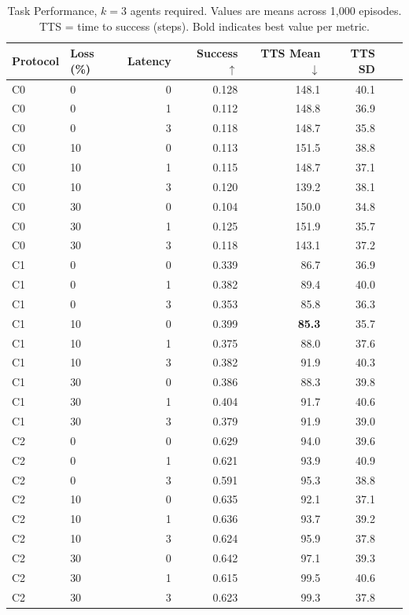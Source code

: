 \documentclass[pdflatex,sn-mathphys-num]{sn-jnl}%
\theoremstyle{thmstyleone}%
\theoremstyle{thmstyletwo}%
\theoremstyle{thmstylethree}%
\begin{document}
\begin{appendices}
\begin{table}[htbp]
\centering
\caption{Task Performance, $k=3$ agents required. Values are means across 1,000 episodes. TTS = time to success (steps). Bold indicates best value per metric.}
\label{tab:appendix_task_b}
\small
\begin{tabular}{llrrrrrr}
\toprule
Protocol & Loss (\%) & Latency & Success $\uparrow$ & TTS Mean $\downarrow$ & TTS SD \\
\midrule
C0 & 0 & 0 & 0.128 & 148.1 & 40.1 \\
C0 & 0 & 1 & 0.112 & 148.8 & 36.9 \\
C0 & 0 & 3 & 0.118 & 148.7 & 35.8 \\
C0 & 10 & 0 & 0.113 & 151.5 & 38.8 \\
C0 & 10 & 1 & 0.115 & 148.7 & 37.1 \\
C0 & 10 & 3 & 0.120 & 139.2 & 38.1 \\
C0 & 30 & 0 & 0.104 & 150.0 & 34.8 \\
C0 & 30 & 1 & 0.125 & 151.9 & 35.7 \\
C0 & 30 & 3 & 0.118 & 143.1 & 37.2 \\
\addlinespace[4pt]
C1 & 0 & 0 & 0.339 & 86.7 & 36.9 \\
C1 & 0 & 1 & 0.382 & 89.4 & 40.0 \\
C1 & 0 & 3 & 0.353 & 85.8 & 36.3 \\
C1 & 10 & 0 & 0.399 & \textbf{85.3} & 35.7 \\
C1 & 10 & 1 & 0.375 & 88.0 & 37.6 \\
C1 & 10 & 3 & 0.382 & 91.9 & 40.3 \\
C1 & 30 & 0 & 0.386 & 88.3 & 39.8 \\
C1 & 30 & 1 & 0.404 & 91.7 & 40.6 \\
C1 & 30 & 3 & 0.379 & 91.9 & 39.0 \\
\addlinespace[4pt]
C2 & 0 & 0 & 0.629 & 94.0 & 39.6 \\
C2 & 0 & 1 & 0.621 & 93.9 & 40.9 \\
C2 & 0 & 3 & 0.591 & 95.3 & 38.8 \\
C2 & 10 & 0 & 0.635 & 92.1 & 37.1 \\
C2 & 10 & 1 & 0.636 & 93.7 & 39.2 \\
C2 & 10 & 3 & 0.624 & 95.9 & 37.8 \\
C2 & 30 & 0 & 0.642 & 97.1 & 39.3 \\
C2 & 30 & 1 & 0.615 & 99.5 & 40.6 \\
C2 & 30 & 3 & 0.623 & 99.3 & 37.8 \\

\end{tabular}
\end{table}
\end{appendices}
\end{document}
